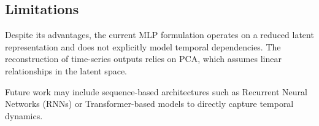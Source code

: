 \subsection{Limitations}

Despite its advantages, the current MLP formulation operates on a reduced latent representation and does not explicitly model temporal dependencies. The reconstruction of time-series outputs relies on PCA, which assumes linear relationships in the latent space.

Future work may include sequence-based architectures such as Recurrent Neural Networks (RNNs) or Transformer-based models to directly capture temporal dynamics.


